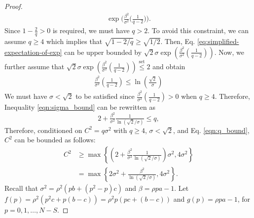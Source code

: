 \documentclass[lettersize,journal]{IEEEtran}
\begin{document}
{\begin{proof}
\begin{align}
        \exp{\Big(
            \tfrac{\beta^2}{\sigma^2}\big(\tfrac{1}{q-2}\big)
        \Big)}.
    \end{align}
    Since $1-\tfrac{2}{q}>0$ is required, we must have $q>2.$
    To avoid 
    this constraint,
    we can assume $q\geq 4$ which implies that $\sqrt{1-2/q}\geq \sqrt{1/2}$. Then, Eq. \eqref{eq:simplified-expectation-of-exp} can be upper bounded by $\sqrt{2}\sigma \exp{\left(
        \frac{\beta^2}{\sigma^2}\left(\frac{1}{q-2}
        \right)\right)}.$
    Now, we further assume that $\sqrt{2}\sigma \exp{\left(
            \frac{\beta^2}{\sigma^2}\left(\frac{1}{q-2}\right)
        \right)}\overset{\mathrm{set}}{\leq} 
        2$ and obtain
     \begin{align}
        \tfrac{\beta^2}{\sigma^2}
        \left(
            \tfrac{1}{q-2}
        \right) 
        \leq 
        \ln{(\tfrac{\sqrt{2}}{\sigma})}\label{eqn:sigma_bound}
    \end{align}
    We must have $\sigma < \sqrt{2}$ to be satisfied since $\frac{\beta^2}{\sigma^2}(\frac{1}{q-2})>0$ when $q\ge4$. Therefore, Inequality \eqref{eqn:sigma_bound} can be rewritten as 
        \begin{equation}
        \label{eqn:q_bound}
            2+\tfrac{\beta^2}{\sigma^2} \tfrac{1}{\ln{(\sqrt{2}/\sigma)}} \leq q,
        \end{equation}
    Therefore, conditioned on $C^2 = q\sigma^2$ with $q\geq4$, $\sigma<\sqrt{2}$, and Eq. \eqref{eqn:q_bound}, 
     $C^2$ can be bounded as follows:
    \begin{align*}
        C^2 &\ge \max \left\{ \left(2+\tfrac{\beta^2}{\sigma^2}\tfrac{1}{\ln{(\sqrt{2}/\sigma)}}\right)\sigma^2, 4\sigma^2\right\}\\
        &= \max\left\{2\sigma^2 + \tfrac{\beta^2}{\ln{(\sqrt{2}/\sigma)}}, 4\sigma^2 \right\}.
    \end{align*}
    Recall that $\sigma^2 = \rho^2(pb+(p^2-p)c)$ and $\beta = \rho pa-1$.
    Let $f(p) = \rho^2(p^2c+p(b-c)) = \rho^2p(pc+(b-c))$ and $g(p)=\rho p a-1$, for $p = 0,1,\ldots,N-S$.

\end{proof}}
\end{document}
